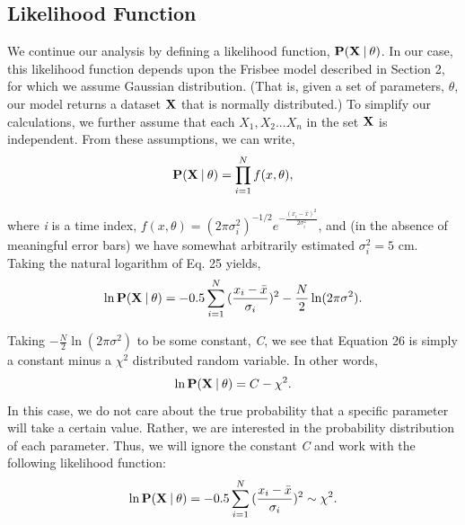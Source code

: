 \documentclass[a4paper,12pt, oneside]{article}
\newcommand\givenbase[1][]{\:#1\lvert\:}
\let\given\givenbase
\begin{document}
\subsection{Likelihood Function}

We continue our analysis by defining a likelihood function, $\bold{P({X}\given\theta})$. In our case, this likelihood function depends upon the Frisbee model described in Section 2, for which we assume Gaussian distribution. (That is, given a set of parameters, $\theta$, our model returns a dataset $\bold{X}$ that is normally distributed.) To simplify our calculations, we further assume that each $X_1, X_2...X_n$ in the set $\bold{X}$ is independent.  From these assumptions, we can write, 
\begin{equation}
\bold{P({X}\given\theta)}={\prod_{i=1}^{N} f(x,\theta)},
\end{equation}

where \textit{i} is a time index, $f(x,\theta)=(2\pi\sigma_{i}^2)^{-1/2}e^{-\frac{(x_{i}-\bar{x})^2}{2\sigma_i^2}}$, and (in the absence of meaningful error bars) we have somewhat arbitrarily estimated $\sigma_i^2=5$ cm. Taking the natural logarithm of Eq. 25 yields,
\begin{equation}
\ln\bold{P({X}\given\theta)}={-0.5 \sum_{i=1}^{N} {(\frac { x_i-\bar{x} } {\sigma_{i}}})^2} - \frac{N}{2}\ln(2\pi\sigma^2).
\end{equation}

Taking $-\frac{N}{2}\ln(2\pi\sigma^2)$ to be some constant, \textit{C}, we see that Equation 26 is simply a constant minus a $\chi^2$ distributed random variable. In other words, 
\begin{equation*}
\ln\bold{P({X}\given\theta)}=C-\chi^2.
\end{equation*}
In this case, we do not care about the true probability that a specific parameter will take a certain value. Rather, we are interested in the probability distribution of each parameter. Thus, we will ignore the constant \textit{C} and work with the following likelihood function:
\begin{equation}
\ln\bold{P({X}\given\theta)}={-0.5 \sum_{i=1}^{N} {(\frac { x_i-\bar{x} } {\sigma_{i}}})^2} \sim \chi^2.
\end{equation}
\end{document}
